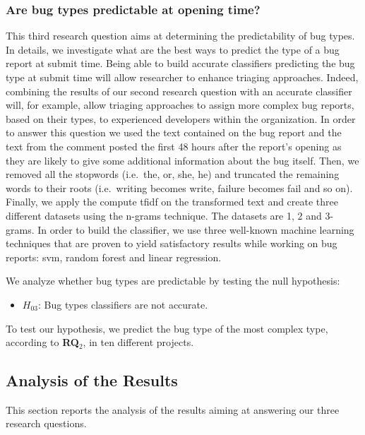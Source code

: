 \subsubsection{Are bug types predictable at opening
time?}\label{are-bug-types-predictable-at-opening-time}

This third research question aims at determining the predictability of
bug types. In details, we investigate what are the best ways to predict
the type of a bug report at submit time. Being able to build accurate
classifiers predicting the bug type at submit time will allow researcher
to enhance triaging approaches. Indeed, combining the results of our
second research question with an accurate classifier will, for example,
allow triaging approaches to assign more complex bug reports, based on
their types, to experienced developers within the organization. In order
to answer this question we used the text contained on the bug report and
the text from the comment posted the first 48 hours after the report's
opening as they are likely to give some additional information about the
bug itself. Then, we removed all the stopwords (i.e.~the, or, she, he)
and truncated the remaining words to their roots (i.e.~writing becomes
write, failure becomes fail and so on). Finally, we apply the compute
tfidf on the transformed text and create three different datasets using
the n-grams technique. The datasets are 1, 2 and 3-grams. In order to
build the classifier, we use three well-known machine learning
techniques that are proven to yield satisfactory results while working
on bug reports: svm, random forest and linear regression.

We analyze whether bug types are predictable by testing the null
hypothesis:

\begin{itemize}
\tightlist
\item
  \(H_{03}\): Bug types classifiers are not accurate.
\end{itemize}

To test our hypothesis, we predict the bug type of the most complex
type, according to \textbf{RQ\(_2\)}, in ten different projects.

\subsection{Analysis of the Results}\label{analysis-of-the-results}

This section reports the analysis of the results aiming at answering our
three research questions.

